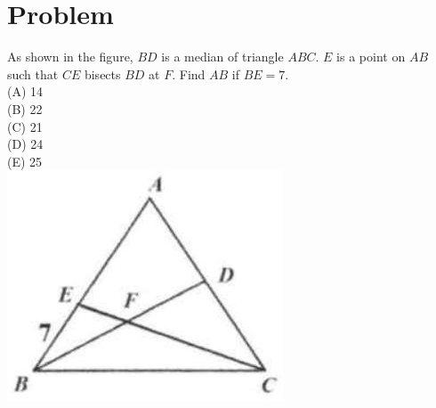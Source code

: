 \documentclass{article}
\begin{document}
\section*{Problem}
As shown in the figure, \(B D\) is a median of triangle \(A B C\). \(E\) is a point on \(A B\) such that \(C E\) bisects \(B D\) at \(F\). Find \(A B\) if \(B E=7\).\\
(A) 14\\
(B) 22\\
(C) 21\\
(D) 24\\
(E) 25\\
\centering
\includegraphics[width=\textwidth]{images/126(1).jpg}
\end{document}
